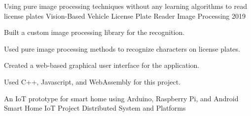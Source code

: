 

\begin{cventries}
    \cventry
        {Using pure image processing techniques without any learning algorithms to read license plates} %
        {Vision-Based Vehicle License Plate Reader} %
        {Image Processing} %
        {2019} %
        {
            \begin{cvitems} %
                \item {Built a custom image processing library for the recognition.}
                \item {Used pure image processing methods to recognize characters on license plates.}
                \item {Created a web-based graphical user interface for the application.}
                \item {Used C++, Javascript, and WebAssembly for this project.}
            \end{cvitems}
        }
    \cventry
        {An IoT prototype for smart home using Arduino, Raspberry Pi, and Android} %
        {Smart Home IoT Project} %
        {Distributed System and Platforms} %

\end{cventries}
